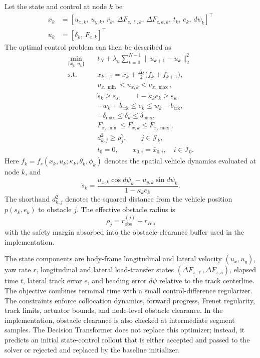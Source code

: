Let the state and control at node $k$ be
\[
\begin{aligned}
x_k &= [u_{x,k},\,u_{y,k},\,r_k,\,\Delta F_{z,\ell,k},\,\Delta F_{z,a,k},\,t_k,\,e_k,\,d\psi_k]^\top \\
u_k &= [\delta_k,\,F_{x,k}]^\top
\end{aligned}
\]
The optimal control problem can then be described as
\[
\begin{aligned}
\min_{\{x_k,u_k\}} \quad &
t_N
+ \lambda_u \sum_{k=0}^{N-1}\|u_{k+1}-u_k\|_2^2 \\
\text{s.t.}\quad
& x_{k+1} = x_k + \frac{\Delta s}{2}\bigl(f_k + f_{k+1}\bigr), \\
& u_{x,\min} \le u_{x,k} \le u_{x,\max}, \\
& \dot s_k \ge \varepsilon_s, \qquad 1-\kappa_k e_k \ge \varepsilon_\kappa, \\
& -w_k+b_{\mathrm{trk}} \le e_k \le w_k-b_{\mathrm{trk}}, \\
& -\delta_{\max}\le \delta_k \le \delta_{\max}, \\
& F_{x,\min}\le F_{x,k}\le F_{x,\max}, \\
& d^2_{k,j} \ge \rho_j^2, \qquad j\in\mathcal J_k, \\
& t_0 = 0, \qquad x_{0,i} = \bar x_{0,i}, \quad i\in\mathcal I_0 .
\end{aligned}
\]
Here $f_k = f_s(x_k,u_k;\kappa_k,\theta_k,\phi_k)$ denotes the spatial vehicle dynamics evaluated at node $k$, and
\[
\dot s_k =
\frac{u_{x,k}\cos d\psi_k - u_{y,k}\sin d\psi_k}{1-\kappa_k e_k}.
\]
The shorthand $d^2_{k,j}$ denotes the squared distance from the vehicle position $p(s_k,e_k)$ to obstacle $j$. The effective obstacle radius is
\[
\rho_j = r^{(j)}_{\mathrm{obs}} + r_{\mathrm{veh}}
\]
with the safety margin absorbed into the obstacle-clearance buffer used in the implementation.

The state components are body-frame longitudinal and lateral velocity $(u_x,u_y)$, yaw rate $r$, longitudinal and lateral load-transfer states $(\Delta F_{z,\ell},\Delta F_{z,a})$, elapsed time $t$, lateral track error $e$, and heading error $d\psi$ relative to the track centerline. The objective combines terminal time with a small control-difference regularizer. The constraints enforce collocation dynamics, forward progress, Frenet regularity, track limits, actuator bounds, and node-level obstacle clearance. In the implementation, obstacle clearance is also checked at intermediate segment samples. The Decision Transformer does not replace this optimizer; instead, it predicts an initial state-control rollout that is either accepted and passed to the solver or rejected and replaced by the baseline initializer.

